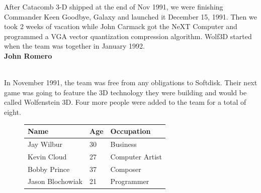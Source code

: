 \documentclass[book.tex]{subfiles}
\begin{document}
\par
\begin{fancyquotes}
After Catacomb 3-D shipped at the end of Nov 1991, we were finishing Commander Keen Goodbye, Galaxy and launched it December 15, 1991. Then we took 2 weeks of vacation while John Carmack got the NeXT Computer and programmed a VGA vector quantization compression algorithm. Wolf3D started when the team was together in January 1992.
 \bigskip \\
\textbf{John Romero}
 \end{fancyquotes}\\

In November 1991, the team was free from any obligations to Softdisk. Their next game was going to feature the 3D technology they were building and would be called Wolfenstein 3D. Four more people were added to the team for a total of eight.
 \begin{figure}[H]

\centering  
\begin{tabularx}{\textwidth}{ X  X  X  }
  \toprule
  \textbf{Name} &  \textbf{Age} & \textbf{Occupation} \\
  \toprule 
   Jay Wilbur & 30 &  Business\\
   Kevin Cloud\protect\footnotemark & 27 &  Computer Artist\\
   Bobby Prince\protect\footnotemark & 37 &  Composer\\
   Jason Blochowiak\protect\footnotemark & 21 &   Programmer\\
     \toprule
\end{tabularx}
\label{fig:Id Software hires}
\end{figure}
\addtocounter{footnote}{-2}

\end{document}
